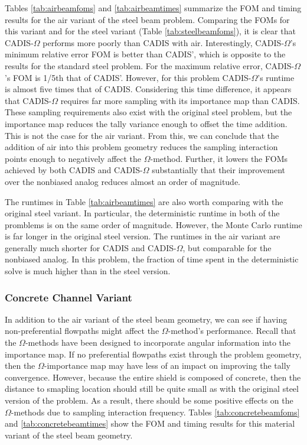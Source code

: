 Tables \ref{tab:airbeamfoms} and \ref{tab:airbeamtimes} summarize the FOM and timing
results for the air variant of the steel beam problem. Comparing the FOMs for
this variant and for the steel variant (Table \ref{tab:steelbeamfoms}), it is
clear that CADIS-$\Omega$ performs more poorly than CADIS with air.
Interestingly, CADIS-$\Omega$'s minimum relative error FOM is better than
CADIS', which is opposite to the results for the standard steel problem. For the
maximum relative error, CADIS-$\Omega$'s FOM is 1/5th that of CADIS'. However,
for this problem CADIS-$\Omega$'s runtime is almost five times that of CADIS.
Considering this time difference, it appears that CADIS-$\Omega$ requires far
more sampling with its importance map than CADIS. These sampling requirements
also exist with the original steel problem, but the importance map reduces the
tally variance enough to offset the time addition. This is not the case for the
air variant. From this, we can conclude that the addition of air into this
problem geometry reduces the sampling interaction points enough to negatively
affect the $\Omega$-method. Further, it lowers the FOMs achieved by both CADIS
and CADIS-$\Omega$ substantially that their improvement over the nonbiased
analog reduces almost an order of magnitude.

The runtimes in Table \ref{tab:airbeamtimes} are also worth comparing with the
original steel variant. In particular, the deterministic runtime in both of the
promblems is on the same order of magnitude. However, the Monte Carlo runtime is
far longer in the original steel version. The runtimes in the air variant are
generally much shorter for CADIS and CADIS-$\Omega$, but comparable for the
nonbiased analog. In this problem, the fraction of time spent in the
deterministic solve is much higher than in the steel version.

\subsubsection{Concrete Channel Variant}
\label{subsubsec:concretebeam}

In addition to the air variant of the steel beam geometry, we can see if having
non-preferential flowpaths might affect the $\Omega$-method's performance.
Recall that the $\Omega$-methods have been designed to incorporate angular
information into the importance map. If no preferential flowpaths exist through
the problem geometry, then the $\Omega$-importance map may have less of an
impact on improving the tally convergence. However, because the entire shield is
composed of concrete, then the distance to smapling location should still be
quite small as with the original steel version of the problem. As a result, there
should be some positive effects on the $\Omega$-methods due to sampling
interaction frequency. Tables \ref{tab:concretebeamfoms} and
\ref{tab:concretebeamtimes} show the FOM and timing results for this material
variant of the steel beam geometry.

